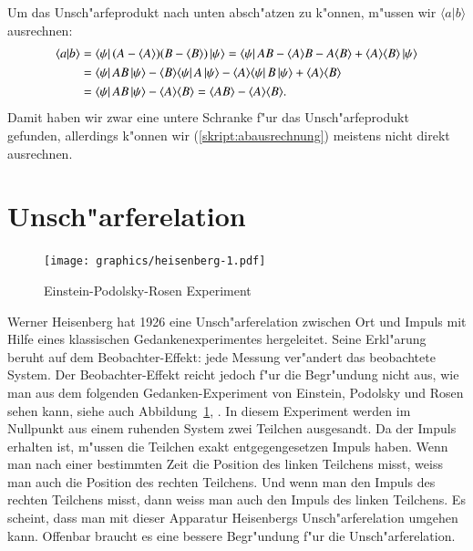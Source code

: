 Um das Unsch"arfeprodukt nach unten absch"atzen zu k"onnen, m"ussen
wir $\langle a|b\rangle$ ausrechnen:
\begin{align}
\langle a|b\rangle
&=
\langle\psi|\,
(A-\langle A\rangle)(B-\langle B\rangle)
\,|\psi\rangle
=
\langle\psi|\,
AB-\langle A\rangle B-A\langle B\rangle
+
\langle A\rangle\langle B\rangle
\,|\psi\rangle
\notag
\\
&=
\langle\psi|\,AB\,|\psi\rangle
-\langle B\rangle\langle\psi|\,A\,|\psi\rangle
-\langle A\rangle\langle\psi|\,B\,|\psi\rangle
+
\langle A\rangle\langle B\rangle
\notag
\\
&=
\langle\psi|\,AB\,|\psi\rangle
-
\langle A\rangle\langle B\rangle
=
\langle AB\rangle
-
\langle A\rangle\langle B\rangle
.
\label{skript:abausrechnung}
\end{align}
Damit haben wir zwar eine untere Schranke f"ur das Unsch"arfeprodukt
gefunden, allerdings k"onnen wir (\ref{skript:abausrechnung}) meistens
nicht direkt ausrechnen.

%
%
\section{Unsch"arferelation}
\begin{figure}
\centering
\texttt{[image: graphics/heisenberg-1.pdf]}
\caption{Einstein-Podolsky-Rosen Experiment
\label{skript:epr-experiment}}
\end{figure}
Werner Heisenberg hat 1926 eine Unsch"arferelation zwischen Ort und Impuls
mit Hilfe eines klassischen Gedankenexperimentes hergeleitet.
Seine Erkl"arung beruht auf dem Beobachter-Effekt: jede Messung
ver"andert das beobachtete System.
Der Beobachter-Effekt reicht jedoch f"ur die Begr"undung nicht
aus, wie man aus dem folgenden Gedanken-Experiment von Einstein,
Podolsky und Rosen sehen kann, siehe
auch Abbildung~\ref{skript:epr-experiment}, \cite{skript:epr}.
In diesem Experiment werden im Nullpunkt aus einem ruhenden System
zwei Teilchen ausgesandt.
Da der Impuls erhalten ist, m"ussen die Teilchen exakt entgegengesetzen
Impuls haben.
Wenn man nach einer bestimmten Zeit die Position des linken Teilchens misst,
weiss man auch die Position des rechten Teilchens.
Und wenn man den Impuls des rechten Teilchens misst, dann weiss
man auch den Impuls des linken Teilchens.
Es scheint, dass man mit dieser Apparatur Heisenbergs Unsch"arferelation
umgehen kann.
Offenbar braucht es eine bessere Begr"undung f"ur die Unsch"arferelation.

